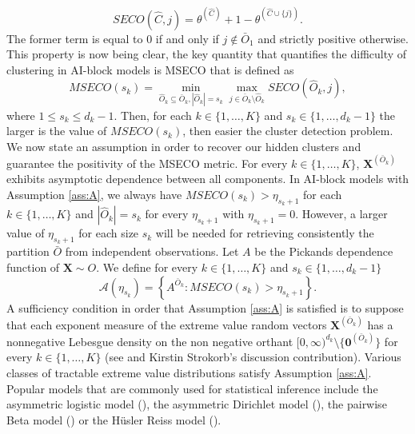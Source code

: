 \documentclass[11pt]{article}
\newenvironment{Assumption}[1]
  {\renewcommand\theinnerassumption{#1}\innerassumption}
  {\endinnerassumption}
\begin{document}
	\begin{equation}
		\label{eq:SECO}
		SECO(\hat{C}, j) = \theta^{(\hat{C})} + 1 - \theta^{(\hat{C} \cup \{j\})}.
	\end{equation}
	The former term is equal to $0$ if and only if $j \notin \bar{O}_1$ and strictly positive otherwise. This property is now being clear, the key quantity that quantifies the difficulty of clustering in AI-block models is MSECO that is defined as
	\begin{equation}
		\label{eq:MSECO}
		MSECO(s_k) = \underset{\hat{O}_k \subseteq \bar{O}_k , |\hat{O}_k| = s_k} {\min} \underset{j \in \bar{O}_k \setminus \hat{O}_k}{\max} SECO(\hat{O}_k, j),
	\end{equation}
	where $1 \leq s_k \leq d_k-1$. Then, for each $k \in \{1,\dots,K\}$ and $s_k \in \{1, \dots, d_k-1\}$ the larger is the value of $MSECO(s_k)$, then easier the cluster detection problem. We now state an assumption in order to recover our hidden clusters and guarantee the positivity of the MSECO metric. 
	\begin{Assumption}
		A For every $k \in \{1,\dots, K\}$, $\textbf{X}^{(\bar{O}_k)}$ exhibits asymptotic dependence between all components.
		\label{ass:A}
	\end{Assumption}
	In AI-block models with Assumption \ref{ass:A}, we always have $MSECO(s_k) > \eta_{s_k +1}$ for each $k \in \{1,\dots,K\}$ and $|\hat{O}_k| = s_k$ for every $\eta_{s_k+1}$ with $\eta_{s_k +1} = 0$. However, a larger value of $\eta_{s_k+1}$ for each size $s_k$ will be needed for retrieving consistently the partition $\bar{O}$ from independent observations. Let $A$ be the Pickands dependence function of $\textbf{X} \sim O$. We define for every $k \in \{1,\dots,K\}$ and $s_k \in \{1,\dots, d_k-1\}$
	\begin{equation*}
		\mathcal{A}(\eta_{s_k}) = \left\{ A^{\bar{O}_k} : MSECO(s_k) > \eta_{s_k+1} \right\}.
	\end{equation*}
	A sufficiency condition in order that Assumption \ref{ass:A} is satisfied is to suppose that each exponent measure of the extreme value random vectors $\textbf{X}^{(\bar{O}_k)}$ has a nonnegative Lebesgue density on the non negative orthant $[0,\infty)^{d_k} \setminus \{\textbf{0}^{(\bar{O}_k)}\}$ for every $k \in \{1, \dots, K\}$ (see \cite{engelke2020graphical} and Kirstin Strokorb's discussion contribution). Various classes of tractable extreme value distributions satisfy Assumption \ref{ass:A}. Popular models that are commonly used for statistical inference include the asymmetric logistic model (\cite{10.1093/biomet/77.2.245}), the asymmetric Dirichlet model (\cite{10.2307/2345748}), the pairwise Beta model (\cite{COOLEY20102103}) or the Hüsler Reiss model (\cite{HUSLER1989283}).
\end{document}
